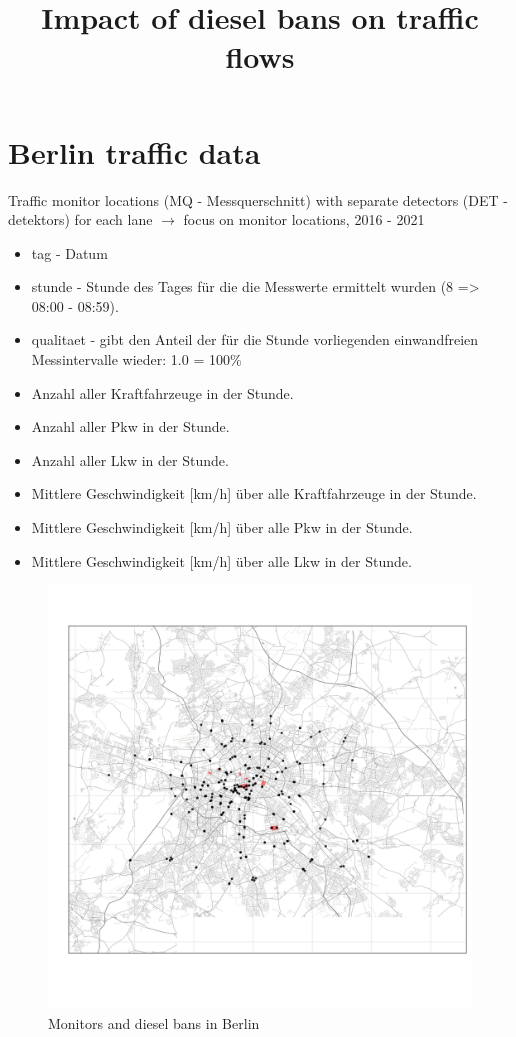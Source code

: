 \documentclass[a4paper, 10pt]{article}
\title{Impact of diesel bans on traffic flows}
\begin{document}
\maketitle

\color[rgb]{0,0,0}
\section{Berlin traffic data}

Traffic monitor locations (MQ - Messquerschnitt) with separate detectors (DET - detektors) for each lane $\rightarrow$ focus on monitor locations, 2016 - 2021

\begin{itemize}
   \item tag - Datum
   \item stunde - Stunde des Tages für die die Messwerte ermittelt wurden (8 => 08:00 - 08:59).
   \item qualitaet - gibt den Anteil der für die Stunde vorliegenden einwandfreien Messintervalle wieder: 1.0 = 100\%
   \item Anzahl aller Kraftfahrzeuge in der Stunde.
   \item Anzahl aller Pkw in der Stunde.
   \item Anzahl aller Lkw in der Stunde.
	 \item Mittlere Geschwindigkeit [km/h] über alle Kraftfahrzeuge in der Stunde.
   \item Mittlere Geschwindigkeit [km/h] über alle Pkw in der Stunde.
   \item Mittlere Geschwindigkeit [km/h] über alle Lkw in der Stunde.
\end{itemize}

\begin{figure}[!htb]
\centering
\caption{Monitors and diesel bans in Berlin}
\includegraphics[width = \textwidth]{../04_figures/map_Berlin.png}
\end{figure}
\end{document}
